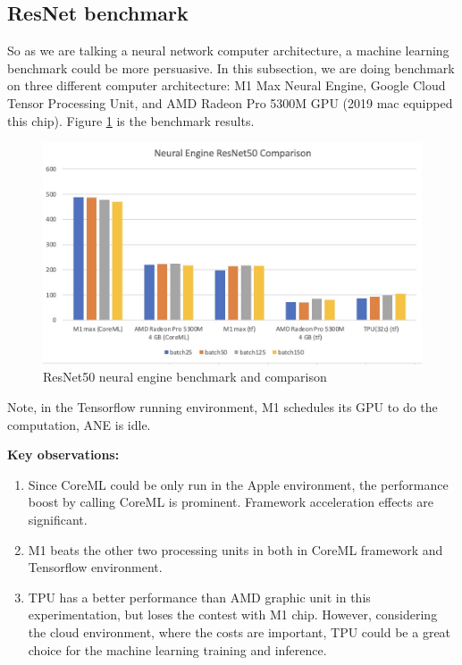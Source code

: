 \documentclass[11pt]{article}
\begin{document}
\subsection*{ResNet benchmark}
So as we are talking a neural network computer architecture, a machine learning benchmark could be more persuasive. In this subsection, we are doing benchmark on three different computer architecture: M1 Max Neural Engine, Google Cloud Tensor Processing Unit, and AMD Radeon Pro 5300M GPU (2019 mac equipped this chip). Figure \ref{fig:ResNet50 neural engine benchmark and comparison} is the benchmark results.

\begin{figure}[h]
    \centering
    \includegraphics[scale = 0.4]{neural_benchmark.jpg}
    \caption{ResNet50 neural engine benchmark and comparison}
	\label{fig:ResNet50 neural engine benchmark and comparison}
\end{figure}

Note, in the Tensorflow running environment, M1 schedules its GPU to do the computation, ANE is idle. 

\textbf{Key observations:}

\begin{enumerate}
  \item Since CoreML could be only run in the Apple environment, the performance boost by calling CoreML is prominent. Framework acceleration effects are significant.
  \item M1 beats the other two processing units in both in CoreML framework and Tensorflow environment. 
  \item TPU has a better performance than AMD graphic unit in this experimentation, but loses the contest with M1 chip. However, considering the cloud environment, where the costs are important, TPU could be a great choice for the machine learning training and inference.
\end{enumerate}
\end{document}
